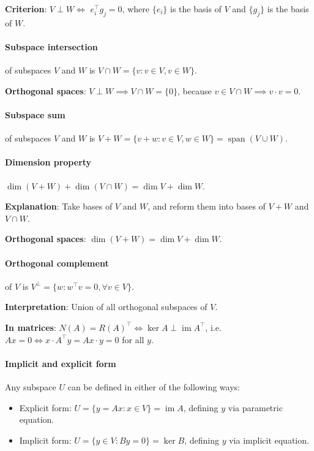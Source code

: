 \documentclass{article}
\begin{document}
\textbf{Criterion}: $V \perp W \iff$ $e_i^\top g_j = 0$, where $\{e_i\}$ is the basis of $V$ and $\{g_j\}$ is the basis of $W$.

\paragraph{Subspace intersection} of subspaces $V$ and $W$ is $V \cap W = \{v : v \in V, v \in W\}$.

\textbf{Orthogonal spaces}: $V \perp W \implies V \cap W = \{0\}$, because $v \in V \cap W \implies v \cdot v = 0$.

\paragraph{Subspace sum} of subspaces $V$ and $W$ is $V + W = \{v + w : v \in V, w \in W\} = \operatorname{span}(V \cup W)$.

\paragraph{Dimension property} $\dim(V+W) + \dim(V \cap W) = \dim V + \dim W$.

\textbf{Explanation}: Take bases of $V$ and $W$, and reform them into bases of $V+W$ and $V \cap W$.

\textbf{Orthogonal spaces}: $\dim (V+W) = \dim V + \dim W$.

\paragraph{Orthogonal complement} of $V$ is $V^\perp = \{w : w^\top v = 0,  \forall v \in V \}$.

\textbf{Interpretation}: Union of all orthogonal subspaces of $V$.

\textbf{In matrices}: $N(A) = R(A)^\top \iff \ker A \perp \operatorname{im} A^\top$, i.e. $Ax = 0 \iff x \cdot A^\top y = Ax \cdot y = 0$ for all $y$.


\paragraph{Implicit and explicit form} Any subspace $U$ can be defined in either of the following ways:

\begin{itemize}
    \item Explicit form: $U = \{y = Ax : x \in V\} = \operatorname{im} A$, defining $y$ via parametric equation.
    \item Implicit form: $U = \{y \in V : By = 0\} = \ker B$, defining $y$ via implicit equation.
\end{itemize}
\end{document}
